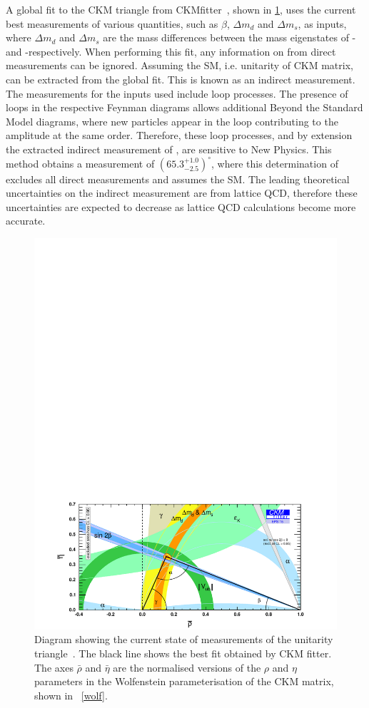 A global fit to the CKM triangle from CKMfitter~\cite{CKMFitter}, shown in \fig\ref{globalfit}, uses the current best measurements of various quantities, such as $\beta$, $\Delta m_d$ and $\Delta m_s$, as inputs, where $\Delta m_d$ and $\Delta m_s$ are the mass differences between the mass eigenstates of \Bz-\Bzb and \Bs-\Bsb respectively. When performing this fit, any information on \Pgamma from direct measurements can be ignored. Assuming the SM, i.e. unitarity of CKM matrix, \Pgamma can be extracted from the global fit. This is known as an indirect measurement. The measurements for the inputs used include loop processes. The presence of loops in the respective Feynman diagrams allows additional Beyond the Standard Model diagrams, where new particles appear in the loop contributing to the amplitude at the same order. Therefore, these loop processes, and by extension the extracted indirect measurement of \Pgamma, are sensitive to New Physics. This method obtains a \Pgamma measurement of $(65.3^{+1.0}_{-2.5})^{\circ}$, where this determination of \Pgamma excludes all direct measurements and assumes the SM. The leading theoretical uncertainties on the indirect measurement are from lattice QCD, therefore these uncertainties are expected to decrease as lattice QCD calculations become more accurate. 
\begin{figure}[!ht]
\centering
\includegraphics[trim = 0mm 0mm 0mm 180mm,clip,width=0.9\linewidth]{figures/theory/rhoeta_small_global.pdf}
\caption{Diagram showing the current state of measurements of the unitarity triangle~\cite{CKMFitter}. The black line shows the best fit obtained by CKM fitter. The axes $\bar{\rho}$ and $\bar{\eta}$ are the normalised versions of the $\rho$ and $\eta$ parameters in the Wolfenstein parameterisation of the CKM matrix, shown in \eqn~\ref{wolf}.}
\label{globalfit}
\end{figure}

